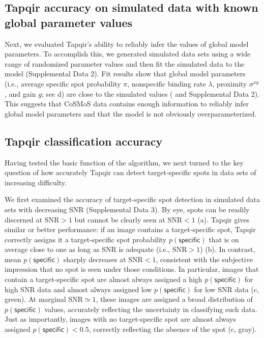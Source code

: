 

\subsection{Tapqir accuracy on simulated data with known global parameter values}

Next, we evaluated Tapqir's ability to reliably infer the values of global model parameters. To  accomplish this, we generated simulated data sets using a wide range of randomized parameter values and then fit the simulated data to the model (Supplemental Data 2). Fit results show that global model parameters (i.e., average specific spot probability $\pi$, nonspecific binding rate $\lambda$, proximity $\sigma^{xy}$, and gain $g$; see d) are close to the simulated values ( and Supplemental Data 2). This suggests that CoSMoS data contains enough information to reliably infer global model parameters and that the model is not obviously overparameterized. 

\subsection{Tapqir classification accuracy}

Having tested the basic function of the algorithm, we next turned to the key question of how accurately Tapqir can detect target-specific spots in data sets of increasing difficulty.

We first examined the accuracy of target-specific spot detection in simulated data sets with decreasing SNR (Supplemental Data 3). By eye, spots can be readily discerned at $\mathrm{SNR}>1$ but cannot be clearly seen at $\mathrm{SNR}<1$ (a). Tapqir gives similar or better performance:  if an image contains a target-specific spot, Tapqir correctly assigns it a target-specific spot probability $p(\mathsf{specific})$ that is on average close to one as long as SNR is adequate (i.e., $\mathrm{SNR}>1$) (b).  In contrast, mean $p(\mathsf{specific})$ sharply decreases at $\mathrm{SNR}<1$, consistent with the subjective impression that no spot is seen under those conditions.  In particular, images that contain a target-specific spot are almost always assigned a high $p(\mathsf{specific})$ for high SNR data and almost always assigned low $p(\mathsf{specific})$ for low SNR data (c, green).  At marginal $\mathrm{SNR} \simeq 1$, these images are assigned a broad distribution of $p(\mathsf{specific})$ values, accurately reflecting the uncertainty in classifying such data.  Just as importantly, images with no target-specific spot are almost always assigned $p(\mathsf{specific}) < 0.5$, correctly reflecting the absence of the spot (c, gray).

